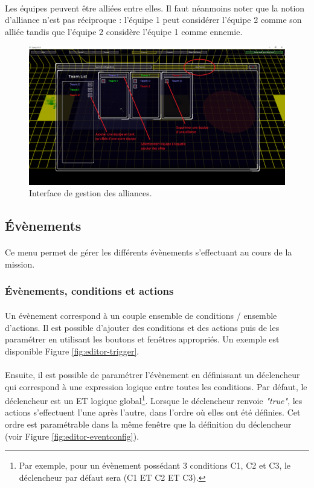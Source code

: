\documentclass[a4paper]{article}
\begin{document}
\paragraph{ }
Les équipes peuvent être alliées entre elles. Il faut néanmoins noter que la notion d'alliance n'est pas réciproque : l'équipe 1 peut considérer l'équipe 2 comme son alliée tandis que l'équipe 2 considère l'équipe 1 comme ennemie.
\begin{figure}[H]
\centering
\includegraphics[width=\linewidth]{editor-allyteam.png}
\caption{Interface de gestion des alliances.}
\label{fig:editor-allyteam}
\end{figure}
\subsection{Évènements}
\paragraph{ }
Ce menu permet de gérer les différents évènements s'effectuant au cours de la mission.
\subsubsection{Évènements, conditions et actions}
\paragraph{ }
Un évènement correspond à un couple ensemble de conditions / ensemble d'actions. Il est possible d'ajouter des conditions et des actions puis de les paramétrer en utilisant les boutons et fenêtres appropriés. Un exemple est disponible Figure \ref{fig:editor-trigger}.
\paragraph{ }
Ensuite, il est possible de paramétrer l'évènement en définissant un déclencheur qui correspond à une expression logique entre toutes les conditions. Par défaut, le déclencheur est un ET logique global\footnote{Par exemple, pour un évènement possédant 3 conditions C1, C2 et C3, le déclencheur par défaut sera (C1 ET C2 ET C3).}. Lorsque le déclencheur renvoie \textit{"true"}, les actions s'effectuent l'une après l'autre, dans l'ordre où elles ont été définies. Cet ordre est paramétrable dans la même fenêtre que la définition du déclencheur (voir Figure \ref{fig:editor-eventconfig}).
\end{document}
